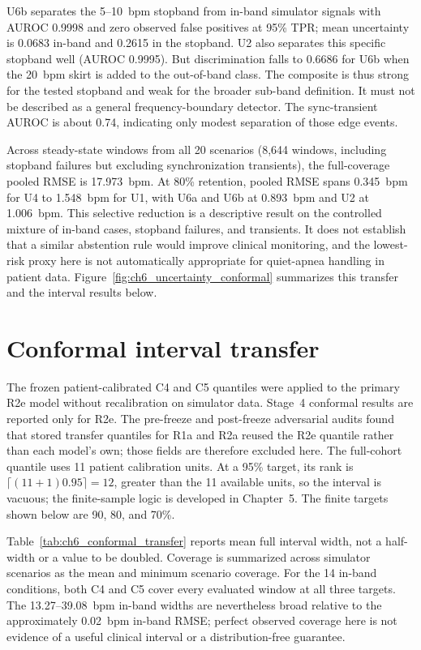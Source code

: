 U6b separates the 5--10~bpm stopband from in-band simulator signals with AUROC 0.9998 and zero observed false positives at 95\% TPR; mean uncertainty is 0.0683 in-band and 0.2615 in the stopband. U2 also separates this specific stopband well (AUROC 0.9995). But discrimination falls to 0.6686 for U6b when the 20~bpm skirt is added to the out-of-band class. The composite is thus strong for the tested stopband and weak for the broader sub-band definition. It must not be described as a general frequency-boundary detector. The sync-transient AUROC is about 0.74, indicating only modest separation of those edge events.

Across steady-state windows from all 20 scenarios (8,644 windows, including stopband failures but excluding synchronization transients), the full-coverage pooled RMSE is 17.973~bpm. At 80\% retention, pooled RMSE spans 0.345~bpm for U4 to 1.548~bpm for U1, with U6a and U6b at 0.893~bpm and U2 at 1.006~bpm. This selective reduction is a descriptive result on the controlled mixture of in-band cases, stopband failures, and transients. It does not establish that a similar abstention rule would improve clinical monitoring, and the lowest-risk proxy here is not automatically appropriate for quiet-apnea handling in patient data. Figure~\ref{fig:ch6_uncertainty_conformal} summarizes this transfer and the interval results below.

\section{Conformal interval transfer}
\label{sec:ch6_conformal}

The frozen patient-calibrated C4 and C5 quantiles were applied to the primary R2e model without recalibration on simulator data. Stage~4 conformal results are reported only for R2e. The pre-freeze and post-freeze adversarial audits found that stored transfer quantiles for R1a and R2a reused the R2e quantile rather than each model's own; those fields are therefore excluded here. The full-cohort quantile uses 11 patient calibration units. At a 95\% target, its rank is $\lceil(11+1)0.95\rceil=12$, greater than the 11 available units, so the interval is vacuous; the finite-sample logic is developed in Chapter~5. The finite targets shown below are 90, 80, and 70\%.

Table~\ref{tab:ch6_conformal_transfer} reports mean full interval width, not a half-width or a value to be doubled. Coverage is summarized across simulator scenarios as the mean and minimum scenario coverage. For the 14 in-band conditions, both C4 and C5 cover every evaluated window at all three targets. The 13.27--39.08~bpm in-band widths are nevertheless broad relative to the approximately 0.02~bpm in-band RMSE; perfect observed coverage here is not evidence of a useful clinical interval or a distribution-free guarantee.

